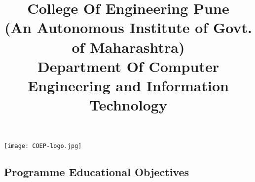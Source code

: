 \documentclass[a4paper,12pt]{article}
\title{
 \vspace{1pt} College Of Engineering Pune\\
 \small{(An Autonomous Institute of Govt. of Maharashtra)}\\
 \large{Department Of Computer Engineering and Information Technology} 
}
\author{
 \noindent{
  \large{Programme: B.Tech (Computer Engineering)}
 }
}
\date{}
\begin{document}

\begin{minipage}{.8\textwidth}
 \maketitle
\end{minipage}
\begin{minipage}{.1\textwidth}
 \hfill{\texttt{[image: COEP-logo.jpg]}}
\end{minipage}
\begin{tcolorbox}[colback=blue!50,colframe=blue]
\section*{Programme Educational Objectives}
\end{tcolorbox}
\end{document}
